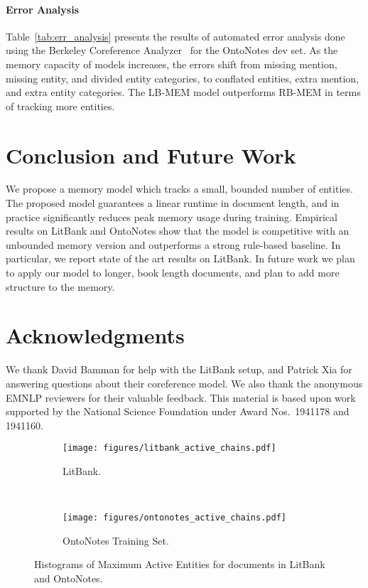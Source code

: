 \documentclass[11pt,a4paper]{article}
\newcommand{\learned}{LB-MEM\xspace}
\newcommand{\lru}{RB-MEM\xspace}
\begin{document}
\paragraph{Error Analysis}
Table~\ref{tab:err_analysis} presents the results of automated error analysis done using the Berkeley Coreference Analyzer~\citep{kummerfeld2013error} for the OntoNotes dev set.
As the memory capacity of models increases, the errors shift from missing mention, missing entity, and divided entity categories, to conflated entities, extra mention, and extra entity categories.
The \learned model outperforms \lru in terms of tracking more entities.  \section{Conclusion and Future Work}
We propose a memory model which tracks a small, bounded number of entities.
The proposed model guarantees a linear runtime in document length, and in practice significantly reduces peak memory usage during training.
Empirical results on LitBank and OntoNotes show that the model is competitive with an unbounded memory version and outperforms a strong rule-based baseline.
In particular, we report state of the art results on LitBank.
In future work we plan to apply our model to longer, book length documents, and plan to add more structure to the memory.


\section*{Acknowledgments}


We thank David Bamman for help with the LitBank setup, and Patrick Xia for answering questions about their coreference model. We also thank the anonymous EMNLP reviewers for their valuable feedback.
This material is based upon work supported by the National Science Foundation under Award Nos.~1941178 and 1941160.
 

\begin{figure*}[h]
\centering
\begin{subfigure}[b]{0.45\textwidth}
        \centering
        \texttt{[image: figures/litbank\_active\_chains.pdf]}
        \caption{LitBank.}
        \label{fig:litbank_active}
    \end{subfigure}~
    \begin{subfigure}[b]{0.45\textwidth}
        \centering
        \texttt{[image: figures/ontonotes\_active\_chains.pdf]}
        \caption{OntoNotes Training Set.}
        \label{fig:ontonotes_active}
    \end{subfigure}
    \caption{Histograms of Maximum Active Entities for documents in LitBank and OntoNotes.}
    \label{fig:active_chains}
\end{figure*}
\end{document}
